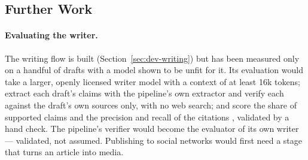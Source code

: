 
\subsection{Further Work}
\label{subsec:future-further}

\paragraph{Evaluating the writer.} The writing flow is built
(Section~\ref{sec:dev-writing}) but has been measured only on a handful
of drafts with a model shown to be unfit for it. Its evaluation would
take a larger, openly licensed writer model with a context of at least
16k tokens; extract each draft's claims with the pipeline's own
extractor and verify each against the draft's own sources only, with
no web search; and score the share of supported claims
\cite{min2023factscore} and the precision and recall of the citations
\cite{gao2023alce}, validated by a hand check. The pipeline's verifier
would become the evaluator of its own writer --- validated, not assumed.
Publishing to social networks would first need a stage that turns an
article into media.


